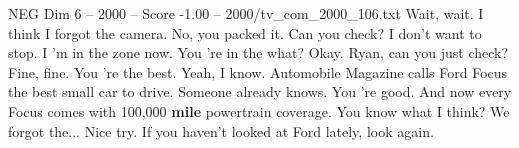 \begin{textsample}{NEG Dim 6 – 2000 – Score -1.00 – 2000/tv\_com\_2000\_106.txt}  \label{ex:f6_neg_017}
Wait, wait.
I think I forgot the camera.
No, you packed it.
Can you check?
I don't want to stop.
I 'm in the zone now.
You 're in the what?
Okay.
Ryan, can you just check?
Fine, fine.
You 're the best.
Yeah, I know.
Automobile Magazine calls Ford Focus the best small car to drive.
Someone already knows.
You 're good.
And now every Focus comes with 100,000 \textbf{mile} powertrain coverage.
You know what I think?
We forgot the...
Nice try.
If you haven't looked at Ford lately, look again.

\end{textsample}
